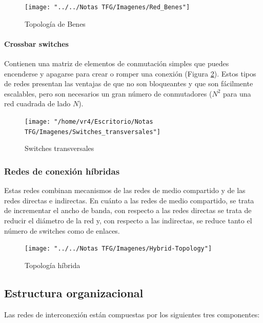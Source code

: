 				\begin{figure}[H]
					\centering
					\texttt{[image: "../../Notas TFG/Imagenes/Red\_Benes"]}
					\caption{Topología de Benes}
					\label{fig:redbenes}
				\end{figure}		

	
	
	
\paragraph{Crossbar switches} 
Contienen una matriz de elementos de conmutación simples que puedes encenderse y apagarse para crear o romper una conexión (Figura \ref{fig:switchestransversales}). Estos tipos de redes presentan las ventajas de que no son bloqueantes y que son fácilmente escalables, pero son necesarios un gran número de conmutadores ($N^{2}$ para una red cuadrada de lado $N$).
	
	\begin{figure}[H]
		\centering
		\texttt{[image: "/home/vr4/Escritorio/Notas TFG/Imagenes/Switches\_transversales"]}
		\caption{Switches transversales}
		\label{fig:switchestransversales}
	\end{figure}

\subsubsection{Redes de conexión híbridas}
Estas redes combinan mecanismos de las redes de medio compartido y de las redes directas e indirectas. En cuánto a las redes de medio compartido, se trata de incrementar el ancho de banda, con respecto a las redes directas se trata de reducir el diámetro de la red y, con respecto a las indirectas, se reduce tanto el número de switches como de enlaces.
	
	\begin{figure}[H]
		\centering
		\texttt{[image: "../../Notas TFG/Imagenes/Hybrid-Topology"]}
		\caption{Topología híbrida}
		\label{fig:hybrid-topology}
	\end{figure}
	

\subsection{Estructura organizacional}
Las redes de interconexión están compuestas por los siguientes tres componentes:

